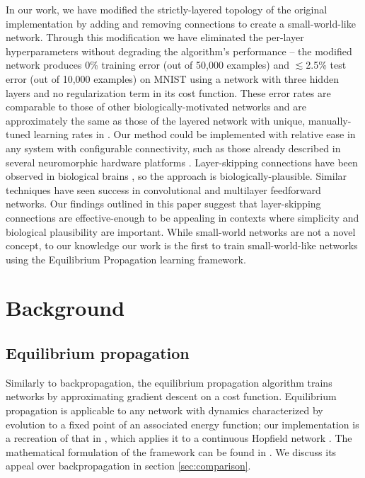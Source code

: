 \documentclass[utf8]{frontiersSCNS}
\begin{document}
In our work, we have modified the strictly-layered topology of the original implementation by adding and removing connections to create a small-world-like network\citep{watts98}. Through this modification we have eliminated the per-layer hyperparameters without degrading the algorithm's performance -- the modified network produces 0\% training error (out of 50,000 examples) and $\lesssim$2.5\% test error (out of 10,000 examples) on MNIST using a network with three hidden layers and no regularization term in its cost function. These error rates are comparable to those of other biologically-motivated networks \citep{bartunov2018} and are approximately the same as those of the layered network with unique, manually-tuned learning rates in \citep{scellier17}. Our method could be implemented with relative ease in any system with configurable connectivity, such as those already described in several neuromorphic hardware platforms \citep{davies2018, schemmel2010, shainline2019}. Layer-skipping connections have been observed in biological brains \citep{bullmore2009}, so the approach is biologically-plausible. Similar techniques have seen success in convolutional \citep{he2015, srivastava2015} and multilayer feedforward \citep{xiaohu2011, krishnan2019} networks. Our findings outlined in this paper suggest that layer-skipping connections are effective-enough to be appealing in contexts where simplicity and biological plausibility are important. While small-world networks are not a novel concept, to our knowledge our work is the first to train small-world-like networks using the Equilibrium Propagation learning framework.

\section{Background}

\subsection{Equilibrium propagation}
\label{sec:eqp_formulation}

Similarly to backpropagation, the equilibrium propagation algorithm \citep{scellier17} trains networks by approximating gradient descent on a cost function. Equilibrium propagation is applicable to any network with dynamics characterized by evolution to a fixed point of an associated energy function; our implementation is a recreation of that in \citep{scellier17}, which applies it to a continuous Hopfield network \citep{hopfield1984}. The mathematical formulation of the framework can be found in \citep{scellier17}. We discuss its appeal over backpropagation in section \ref{sec:comparison}.
\end{document}
